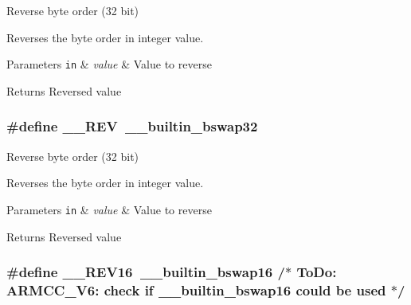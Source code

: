 Reverse byte order (32 bit) 

Reverses the byte order in integer value. 
\begin{DoxyParams}[1]{Parameters}
\mbox{\tt in}  & {\em value} & Value to reverse \\
\hline
\end{DoxyParams}
\begin{DoxyReturn}{Returns}
Reversed value 
\end{DoxyReturn}
\hypertarget{group___c_m_s_i_s___core___instruction_interface_ga14f54807872c0f5e05604c4924abfdae}{
\subsubsection[{\-\_\-\-\_\-\-R\-E\-V}]{\setlength{\rightskip}{0pt plus 5cm}\#define \-\_\-\-\_\-\-R\-E\-V~\-\_\-\-\_\-builtin\-\_\-bswap32}}\label{group___c_m_s_i_s___core___instruction_interface_ga14f54807872c0f5e05604c4924abfdae}


Reverse byte order (32 bit) 

Reverses the byte order in integer value. 
\begin{DoxyParams}[1]{Parameters}
\mbox{\tt in}  & {\em value} & Value to reverse \\
\hline
\end{DoxyParams}
\begin{DoxyReturn}{Returns}
Reversed value 
\end{DoxyReturn}
\hypertarget{group___c_m_s_i_s___core___instruction_interface_ga4e3acd41e7667cdf65ffcd8c76a8613f}{
\subsubsection[{\-\_\-\-\_\-\-R\-E\-V16}]{\setlength{\rightskip}{0pt plus 5cm}\#define \-\_\-\-\_\-\-R\-E\-V16~\-\_\-\-\_\-builtin\-\_\-bswap16                           /$\ast$ To\-Do\-:  A\-R\-M\-C\-C\-\_\-\-V6\-: check if \-\_\-\-\_\-builtin\-\_\-bswap16 could be used $\ast$/}}\label{group___c_m_s_i_s___core___instruction_interface_ga4e3acd41e7667cdf65ffcd8c76a8613f}


